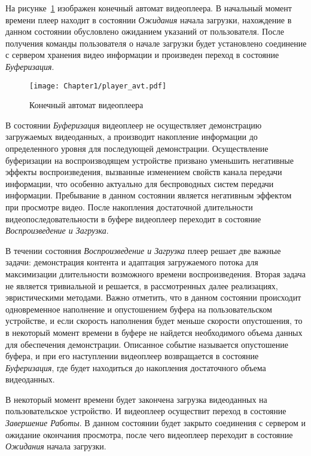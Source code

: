 На рисунке~\ref{fig:Player_avt} изображен конечный автомат видеоплеера. В начальный момент времени плеер находит в состоянии \textit{Ожидания} начала загрузки, нахождение в данном состоянии обусловлено ожиданием указаний от пользователя. После получения команды пользователя о начале загрузки будет установлено соединение с сервером хранения видео информации и произведен переход в состояние \textit{Буферизация}.

\begin{figure}[htbp]
\begin{center}
\texttt{[image: Chapter1/player\_avt.pdf]}
\caption{Конечный автомат видеоплеера}
\label{fig:Player_avt}
\end{center}
\end{figure}

В состоянии \textit{Буферизация} видеоплеер не осуществляет демонстрацию загружаемых видеоданных, а производит накопление информации до определенного уровня для последующей демонстрации. Осуществление буферизации на воспроизводящем устройстве призвано уменьшить негативные эффекты воспроизведения, вызванные изменением свойств канала передачи информации, что особенно актуально для беспроводных систем передачи информации. Пребывание в данном состоянии является негативным эффектом при просмотре видео. После накопления достаточной длительности видеопоследовательности в буфере видеоплеер переходит в состояние \textit{Воспроизведение и Загрузка}.

В течении состояния \textit{Воспроизведение и Загрузка} плеер решает две важные задачи: демонстрация контента и адаптация загружаемого потока для максимизации длительности возможного времени воспроизведения. Вторая задача не является тривиальной и решается, в рассмотренных далее реализациях, эвристическими методами. Важно отметить, что в данном состоянии происходит одновременное наполнение и опустошением буфера на пользовательском устройстве, и если скорость наполнения будет меньше скорости опустошения, то в некоторый момент времени в буфере не найдется необходимого объема данных для обеспечения демонстрации. Описанное событие называется опустошение буфера, и при его наступлении видеоплеер возвращается в состояние \textit{Буферизация}, где будет находиться до накопления достаточного объема видеоданных.

В некоторый момент времени будет закончена загрузка видеоданных на пользовательское устройство. И видеоплеер осуществит переход в состояние \textit{Завершение Работы}. В данном состоянии будет закрыто соединения с сервером и ожидание окончания просмотра, после чего видеоплеер переходит в состояние \textit{Ожидания} начала загрузки.

